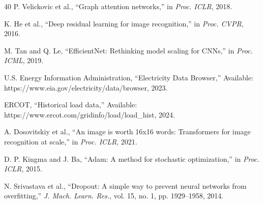\documentclass[journal,12pt,onecolumn]{IEEEtran}
\begin{document}
\begin{thebibliography}{40}
P. Velickovic et al., ``Graph attention networks,'' in \emph{Proc. ICLR}, 2018.

K. He et al., ``Deep residual learning for image recognition,'' in \emph{Proc. CVPR}, 2016.

M. Tan and Q. Le, ``EfficientNet: Rethinking model scaling for CNNs,'' in \emph{Proc. ICML}, 2019.

U.S. Energy Information Administration, ``Electricity Data Browser,'' Available: https://www.eia.gov/electricity/data/browser, 2023.

ERCOT, ``Historical load data,'' Available: https://www.ercot.com/gridinfo/load/load\_hist, 2024.

A. Dosovitskiy et al., ``An image is worth 16x16 words: Transformers for image recognition at scale,'' in \emph{Proc. ICLR}, 2021.

D. P. Kingma and J. Ba, ``Adam: A method for stochastic optimization,'' in \emph{Proc. ICLR}, 2015.

N. Srivastava et al., ``Dropout: A simple way to prevent neural networks from overfitting,'' \emph{J. Mach. Learn. Res.}, vol. 15, no. 1, pp. 1929--1958, 2014.

\end{thebibliography}
\end{document}
